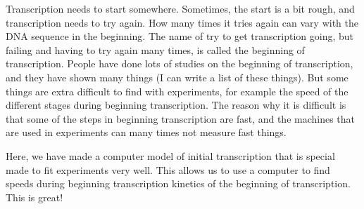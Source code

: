 Transcription needs to start somewhere. Sometimes, the start is a bit rough,
and transcription needs to try again. How many times it tries again can vary
with the DNA sequence in the beginning. The name of try to get transcription
going, but failing and having to try again many times, is called the beginning
of transcription. People have done lots of studies on the beginning of
transcription, and they have shown many things (I can write a list of these
things). But some things are extra difficult to find with
experiments, for example the speed of the different stages during beginning
transcription. The reason why it is difficult is that some of the steps in
beginning transcription are fast, and the machines that are used in
experiments can many times not measure fast things.

Here, we have made a computer model of initial transcription that is special
made to fit experiments very well. This allows us to use a computer to find
speeds during beginning transcription kinetics of the beginning of
transcription. This is great!
